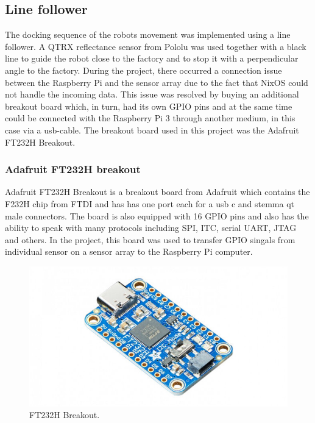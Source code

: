 \subsection{Line follower}

The docking sequence of the robots movement was implemented using a line follower. A QTRX reflectance sensor from Pololu was used together with a black line to guide the robot close to the factory and to stop it with a perpendicular angle to the factory. During the project, there occurred a connection issue between the Raspberry Pi and the sensor array due to the fact that  NixOS could not handle the incoming data. This issue was resolved by buying an additional breakout board which, in turn, had its own GPIO pins and at the same time could be connected with the Raspberry Pi 3 through another medium, in this case via a usb-cable. The breakout board used in this project was the Adafruit FT232H Breakout.

\subsubsection{Adafruit FT232H breakout}
Adafruit FT232H Breakout is a breakout board from Adafruit which contains the F232H chip from FTDI and has has one port each for a usb c and stemma qt male connectors. The board is also equipped with 16 GPIO pins and also has the ability to speak with many protocols including SPI, ITC, serial UART, JTAG and others. In the project, this board was used to transfer GPIO singals from individual sensor on a sensor array to the Raspberry Pi computer.
\begin{figure}[h]
    \centering
    \includegraphics[width =\linewidth]{sections/assets/FT232H.jpg}
    \caption{FT232H Breakout.}
    \label{FT232H}
\end{figure}

